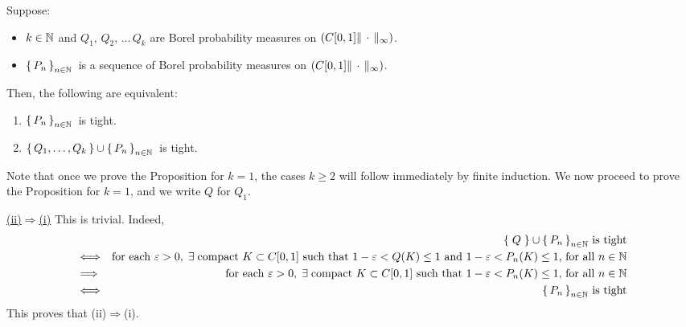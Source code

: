 
\begin{proposition}
\label{FiniteExtensionPreservesTightness}
\mbox{}
\vskip 0.2cm
\noindent
Suppose:
\begin{itemize}
\item	$k \in \mathbb{N}$ and $Q_{1},\,Q_{2},\,\ldots\,Q_{k}$ are Borel probability measures on
		$\left(C[0,1]\Vert\,\cdot\,\Vert_{\infty}\right)$.
\item	$\left\{\,P_{n}\,\right\}_{n\in\mathbb{N}}$\, is a sequence of Borel probability measures on
		$\left(C[0,1]\Vert\,\cdot\,\Vert_{\infty}\right)$.
\end{itemize}
Then, the following are equivalent:
\begin{enumerate}
\item	$\left\{\,P_{n}\,\right\}_{n\in\mathbb{N}}$\, is tight. 
\item	$\left\{\,Q_{1},\ldots,Q_{k}\,\right\}\cup\left\{\,P_{n}\,\right\}_{n\in\mathbb{N}}$\, is tight.
\end{enumerate}
\end{proposition}
\proof
Note that once we prove the Proposition for $k = 1$, the cases $k \geq 2$ will follow immediately by finite induction.
We now proceed to prove the Proposition for $k =1$, and we write $Q$ for $Q_{1}$.

\vskip 0.3cm
\noindent
\underline{(ii)\;$\Longrightarrow$\;(i)}\quad
This is trivial. Indeed,
\begin{eqnarray*}
&&
	\textnormal{$\left\{\;Q\;\right\}\cup\left\{\,P_{n}\,\right\}_{n\in\mathbb{N}}$ is tight}
\\
&\Longleftrightarrow&
	\textnormal{for each $\varepsilon > 0$},\;
	\exists\;\textnormal{compact $K\subset C[0,1]$ such that $1 - \varepsilon < Q(K) \leq 1$
	and $1 - \varepsilon < P_{n}(K) \leq 1$, for all $n \in \mathbb{N}$}
\\
&\Longrightarrow&
	\textnormal{for each $\varepsilon > 0$},\;
	\exists\;\textnormal{compact $K\subset C[0,1]$ such that $1 - \varepsilon < P_{n}(K) \leq 1$, for all $n \in \mathbb{N}$}
\\
&\Longleftrightarrow&
	\textnormal{$\left\{\,P_{n}\,\right\}_{n\in\mathbb{N}}$ is tight}
\end{eqnarray*}
This proves that (ii)\;$\Longrightarrow$\;(i).


